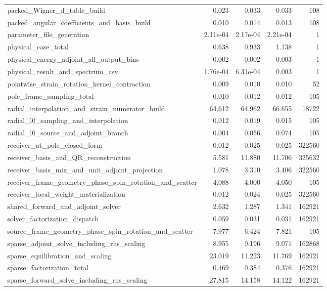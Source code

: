 \documentclass[11pt,a4paper]{article}
\begin{document}
\begin{longtable}{>{\raggedright\arraybackslash}p{10cm}rrrr}
packed\_Wigner\_d\_table\_build & 0.023 & 0.033 & 0.033 & 108 \\
packed\_angular\_coefficients\_and\_basis\_build & 0.010 & 0.014 & 0.013 & 108 \\
parameter\_file\_generation & 2.11e-04 & 2.17e-04 & 2.21e-04 & 1 \\
physical\_case\_total & 0.638 & 0.933 & 1.138 & 1 \\
physical\_energy\_adjoint\_all\_output\_bins & 0.002 & 0.002 & 0.003 & 1 \\
physical\_result\_and\_spectrum\_csv & 1.76e-04 & 6.31e-04 & 0.003 & 1 \\
pointwise\_strain\_rotation\_kernel\_contraction & 0.009 & 0.010 & 0.010 & 52 \\
pole\_frame\_sampling\_total & 0.010 & 0.012 & 0.012 & 105 \\
radial\_interpolation\_and\_strain\_numerator\_build & 64.612 & 64.962 & 66.655 & 18722 \\
radial\_l0\_sampling\_and\_interpolation & 0.012 & 0.019 & 0.015 & 105 \\
radial\_l0\_source\_and\_adjoint\_branch & 0.004 & 0.056 & 0.074 & 105 \\
receiver\_at\_pole\_closed\_form & 0.012 & 0.025 & 0.025 & 322560 \\
receiver\_basis\_and\_QR\_reconstruction & 5.581 & 11.880 & 11.706 & 325632 \\
receiver\_basis\_mix\_and\_unit\_adjoint\_projection & 1.078 & 3.310 & 3.406 & 322560 \\
receiver\_frame\_geometry\_phase\_spin\_rotation\_and\_scatter & 4.088 & 4.000 & 4.050 & 105 \\
receiver\_local\_weight\_materialization & 0.012 & 0.024 & 0.025 & 322560 \\
shared\_forward\_and\_adjoint\_solver & 2.632 & 1.287 & 1.341 & 162921 \\
solver\_factorization\_dispatch & 0.059 & 0.031 & 0.031 & 162921 \\
source\_frame\_geometry\_phase\_spin\_rotation\_and\_scatter & 7.977 & 6.424 & 7.821 & 105 \\
sparse\_adjoint\_solve\_including\_rhs\_scaling & 8.955 & 9.196 & 9.071 & 162868 \\
sparse\_equilibration\_and\_scaling & 23.019 & 11.223 & 11.769 & 162921 \\
sparse\_factorization\_total & 0.469 & 0.384 & 0.376 & 162921 \\
sparse\_forward\_solve\_including\_rhs\_scaling & 27.815 & 14.158 & 14.122 & 162921 \\

\end{longtable}
\end{document}
